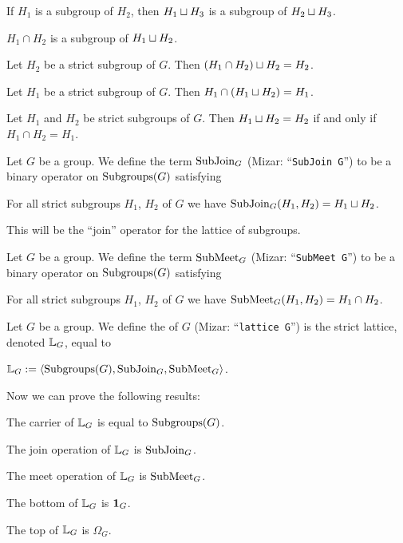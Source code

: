 \documentclass{article}
\begin{document}
\begin{thm}
  If $H_{1}$ is a subgroup of $H_{2}$, then $H_{1}\sqcup H_{3}$ is a
  subgroup of $H_{2}\sqcup H_{3}$.
\item\label{group4:65} $H_{1}\cap H_{2}$ is a subgroup of $H_{1}\sqcup H_{2}$.
\item\label{group4:66} Let $H_{2}$ be a strict subgroup of $G$.
  Then $(H_{1}\cap H_{2})\sqcup H_{2}=H_{2}$.
\item\label{group4:67} Let $H_{1}$ be a strict subgroup of $G$.
  Then $H_{1}\cap(H_{1}\sqcup H_{2})=H_{1}$.
\item\label{group4:68} Let $H_{1}$ and $H_{2}$ be strict subgroups of $G$.
  Then $H_{1}\sqcup H_{2}=H_{2}$ if and only if $H_{1}\cap H_{2}=H_{1}$.
\end{thm}

\begin{definition}
Let $G$ be a group. We define the term $\operatorname{SubJoin}_{G}$ (Mizar:
``\verb#SubJoin G#'') to be a binary
operator on $\operatorname{Subgroups}(G)$ satisfying
\begin{defn}
\item For all strict subgroups $H_{1}$, $H_{2}$ of $G$ we have
  $\operatorname{SubJoin}_{G}(H_{1},H_{2})=H_{1}\sqcup H_{2}$.
\end{defn}
\end{definition}

\begin{remark}
This will be the ``join'' operator for the lattice of subgroups.
\end{remark}

\begin{definition}
Let $G$ be a group. We define the term $\operatorname{SubMeet}_{G}$ (Mizar:
``\verb#SubMeet G#'') to be a binary
operator on $\operatorname{Subgroups}(G)$ satisfying
\begin{defn}
\item For all strict subgroups $H_{1}$, $H_{2}$ of $G$ we have
  $\operatorname{SubMeet}_{G}(H_{1},H_{2})=H_{1}\cap H_{2}$.
\end{defn}
\end{definition}

\begin{definition}
Let $G$ be a group.
We define the  of $G$ (Mizar: ``\verb#lattice G#'')
is the strict lattice, denoted $\mathbb{L}_{G}$, equal to
\begin{defn}
\item $\mathbb{L}_{G}:=\langle\operatorname{Subgroups}(G),\operatorname{SubJoin}_{G},\operatorname{SubMeet}_{G}\rangle$.
\end{defn}
\end{definition}

Now we can prove the following results:
\begin{thm}
\item\label{group4:69} The carrier of $\mathbb{L}_{G}$ is equal to $\operatorname{Subgroups}(G)$.
\item\label{group4:70} The join operation of $\mathbb{L}_{G}$ is $\operatorname{SubJoin}_{G}$.
\item\label{group4:71} The meet operation of $\mathbb{L}_{G}$ is $\operatorname{SubMeet}_{G}$.
\item\label{group4:72} The bottom of $\mathbb{L}_{G}$ is $\mathbf{1}_{G}$.
\item\label{group4:73} The top of $\mathbb{L}_{G}$ is $\Omega_{G}$.
\end{thm}
\end{document}
